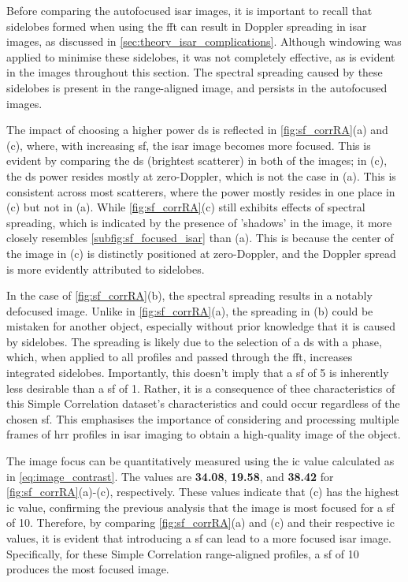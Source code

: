 \documentclass[class=report,11pt,crop=false]{standalone}
\begin{document}
    Before comparing the autofocused \gls{isar} images, it is important to recall that sidelobes formed when using the \gls{fft} can result in Doppler spreading in \gls{isar} images, as discussed in \autoref{sec:theory_isar_complications}.  Although windowing was applied to minimise these sidelobes, it was not completely effective, as is evident in the images throughout this section. The spectral spreading caused by these sidelobes is present in the range-aligned image, and persists in the autofocused images.

    The impact of choosing a higher power \gls{ds} is reflected in \autoref{fig:sf_corrRA}(a) and (c), where, with increasing \gls{sf}, the \gls{isar} image becomes more focused. This is evident by comparing the \gls{ds} (brightest scatterer) in both of the images; in (c), the \gls{ds} power resides mostly at zero-Doppler, which is not the case in (a). This is consistent across most scatterers, where the power mostly resides in one place in (c) but not in (a). While \autoref{fig:sf_corrRA}(c) still exhibits effects of spectral spreading, which is indicated by the presence of 'shadows' in the image, it more closely resembles \autoref{subfig:sf_focused_isar} than (a). This is because the center of the image in (c) is distinctly positioned at zero-Doppler, and the Doppler spread is more evidently attributed to sidelobes.

    In the case of \autoref{fig:sf_corrRA}(b), the spectral spreading results in a notably defocused image. Unlike in \autoref{fig:sf_corrRA}(a), the spreading in (b) could be mistaken for another object, especially without prior knowledge that it is caused by sidelobes. The spreading is likely due to the selection of a \gls{ds} with a phase, which, when applied to all profiles and passed through the \gls{fft}, increases integrated sidelobes. Importantly, this doesn't imply that a \gls{sf} of 5 is inherently less desirable than a \gls{sf} of 1. Rather, it is a consequence of thee characteristics of this Simple Correlation dataset's characteristics and could occur regardless of the chosen \gls{sf}. This emphasises the importance of considering and processing multiple frames of \gls{hrr} profiles in \gls{isar} imaging to obtain a high-quality image of the object.

    The image focus can be quantitatively measured using the \gls{ic} value calculated as in \autoref{eq:image_contrast}. The values are \textbf{34.08}, \textbf{19.58}, and \textbf{38.42} for \autoref{fig:sf_corrRA}(a)-(c), respectively. These values indicate that (c) has the highest \gls{ic} value, confirming the previous analysis that the image is most focused for a \gls{sf} of 10. Therefore, by comparing \autoref{fig:sf_corrRA}(a) and (c) and their respective \gls{ic} values, it is evident that introducing a \gls{sf} can lead to a more focused \gls{isar} image. Specifically, for these Simple Correlation range-aligned profiles, a \gls{sf} of 10 produces the most focused image.
     
\end{document}
